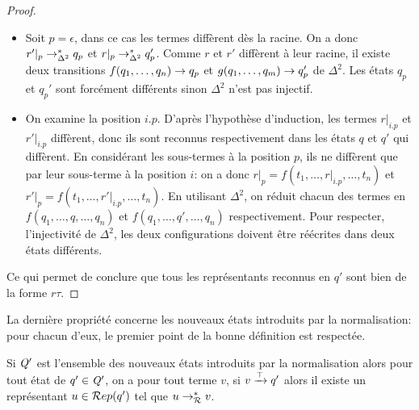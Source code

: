 \begin{proof}
  \begin{itemize}
  \item Soit $p = \epsilon$, dans ce cas les termes diffèrent dès la racine.
    On a donc $r'|_p \rightarrow^*_{\Delta^2} q_p$ et $r|_p \rightarrow^*_{\Delta^2} q'_p$. Comme $r$ et $r'$ diffèrent à leur racine,
    il existe deux transitions $f(q_1, \dots,q_n) \rightarrow q_p$ et $g(q_1, \dots,q_m) \rightarrow q_p'$ de $\Delta^2$. %
    Les états $q_p$ et $q_p'$ sont forcément différents sinon $\Delta^2$ n'est pas injectif. 
  \item On examine la position $i.p$. D'après l'hypothèse d'induction, les termes $r|_{i.p}$ et $r'|_{i.p}$ diffèrent, donc ils 
    sont reconnus respectivement dans les états $q$ et $q'$ qui diffèrent. En considérant les sous-termes à la position $p$,
    ils ne diffèrent que par leur sous-terme à la position $i$: on a donc $r|_p = f(t_1, \dots, r|_{i.p},\dots,t_n)$ et $r'|_p = f(t_1, \dots, r'|_{i.p},\dots,t_n)$.
    En utilisant $\Delta^2$, on réduit chacun des termes en $f(q_1, \dots, q, \dots, q_n)$ et $f(q_1, \dots, q', \dots, q_n)$ respectivement.
    Pour respecter, l'injectivité de $\Delta^2$, les deux configurations doivent être réécrites dans deux états différents.
  \end{itemize}
  Ce qui permet de conclure que tous les représentants reconnus en $q'$ sont bien de la forme $r\tau$.
\end{proof}


La dernière propriété concerne les nouveaux états introduits par la normalisation: pour chacun d'eux,
le premier point de la bonne définition est respectée.
\begin{property}
  \label{prop:norm_well_def}
  Si $\mathit Q'$ est l'ensemble des nouveaux états introduits par la normalisation alors pour tout état de $q'\in \mathit Q'$,
  on a pour tout terme $v$, si $v \xrightarrow{\top} q'$ alors il existe un représentant $u \in \mathcal R ep(q')$ tel que 
  $u \rightarrow^*_\mathcal R v$.
\end{property}

